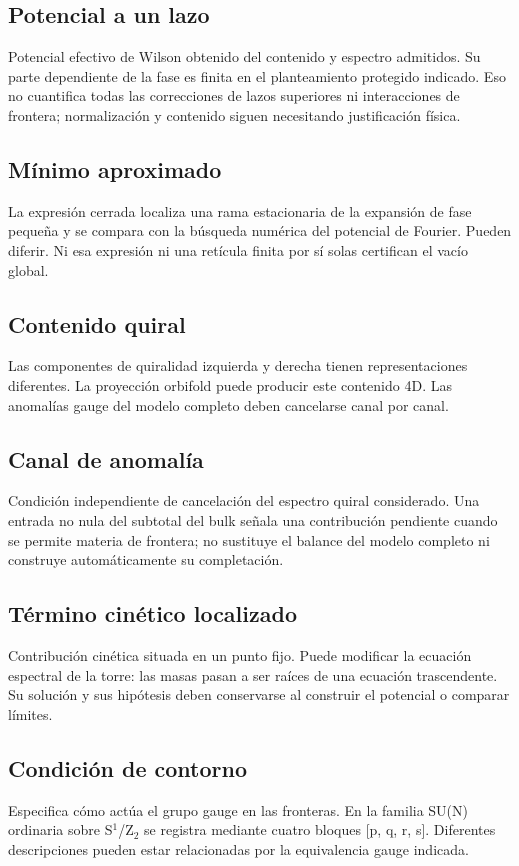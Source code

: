 \documentclass[11pt,a4paper]{article}
\begin{document}
\subsection*{Potencial a un lazo}
Potencial efectivo de Wilson obtenido del contenido y espectro admitidos. Su parte dependiente de la fase es finita en el planteamiento protegido indicado. Eso no cuantifica todas las correcciones de lazos superiores ni interacciones de frontera; normalización y contenido siguen necesitando justificación física.

\subsection*{Mínimo aproximado}
La expresión cerrada localiza una rama estacionaria de la expansión de fase pequeña y se compara con la búsqueda numérica del potencial de Fourier. Pueden diferir. Ni esa expresión ni una retícula finita por sí solas certifican el vacío global.

\subsection*{Contenido quiral}
Las componentes de quiralidad izquierda y derecha tienen representaciones diferentes. La proyección orbifold puede producir este contenido 4D. Las anomalías gauge del modelo completo deben cancelarse canal por canal.

\subsection*{Canal de anomalía}
Condición independiente de cancelación del espectro quiral considerado. Una entrada no nula del subtotal del bulk señala una contribución pendiente cuando se permite materia de frontera; no sustituye el balance del modelo completo ni construye automáticamente su completación.

\subsection*{Término cinético localizado}
Contribución cinética situada en un punto fijo. Puede modificar la ecuación espectral de la torre: las masas pasan a ser raíces de una ecuación trascendente. Su solución y sus hipótesis deben conservarse al construir el potencial o comparar límites.

\subsection*{Condición de contorno}
Especifica cómo actúa el grupo gauge en las fronteras. En la familia SU(N) ordinaria sobre S\ensuremath{{}^{1}}/Z\ensuremath{{}_{2}} se registra mediante cuatro bloques [p, q, r, s]. Diferentes descripciones pueden estar relacionadas por la equivalencia gauge indicada.
\end{document}
